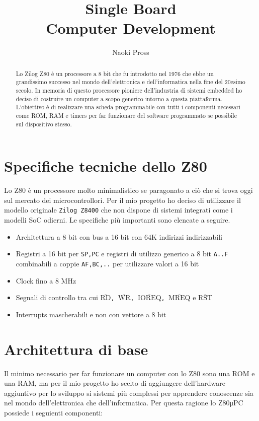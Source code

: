 \documentclass[a4paper, 11pt, twoside]{article}
\title{\vspace{-1cm}\texttt{\prj} Single Board \\ Computer Development }
\author{Naoki Pross}
\newcommand{\prj}{Z80μPC\xspace}
\newcommand{\inv}[1]{$\overline{\mbox{#1}}$}
\begin{document}
\maketitle
\begin{abstract}
    Lo Zilog Z80 \`e un processore a 8 bit che fu introdotto nel 1976 che ebbe
    un grandissimo successo nel mondo dell'elettronica e dell'informatica
    nella fine del 20esimo secolo. In memoria di questo processore pioniere
    dell'industria di sistemi embedded ho deciso di costruire un computer a
    scopo generico intorno a questa piattaforma. L'obiettivo \`e di realizzare
    una scheda programmabile con tutti i componenti necessari come ROM, RAM e
    timers per far funzionare del software programmato se possibile sul
    dispositivo stesso.
\end{abstract}

\section{Specifiche tecniche dello Z80}
Lo Z80 \`e un processore molto minimalistico se paragonato a ci\`o che si
trova oggi sul mercato dei microcontrollori. Per il mio progetto ho deciso di
utilizzare il modello originale \texttt{Zilog Z8400} che non dispone di
sistemi integrati come i modelli SoC odierni. Le specifiche pi\`u importanti
sono elencate a seguire.

\begin{itemize}
    \item Architettura a 8 bit con bus a 16 bit con 64K indirizzi indirizzabili
    \item Registri a 16 bit per {\tt SP,PC} e registri di utilizzo generico a
        8 bit {\tt A..F} combinabili a coppie {\tt AF,BC,..} per utilizzare
        valori a 16 bit
    \item Clock fino a 8 MHz
    \item Segnali di controllo tra cui \texttt{\inv{RD}, \inv{WR},
        \inv{IOREQ}, \inv{MREQ}} e \texttt{\inv{RST}}
    \item Interrupts mascherabili e non con vettore a 8 bit
\end{itemize}

\section{Architettura di base}
Il minimo necessario per far funzionare un computer con lo Z80 sono una ROM e
una RAM, ma per il mio progetto ho scelto di aggiungere dell'hardware
aggiuntivo per lo sviluppo si sistemi pi\`u complessi per apprendere
conoscenze sia nel mondo dell'elettronica che dell'informatica. Per questa 
ragione lo \prj possiede i seguienti componenti:
\end{document}
